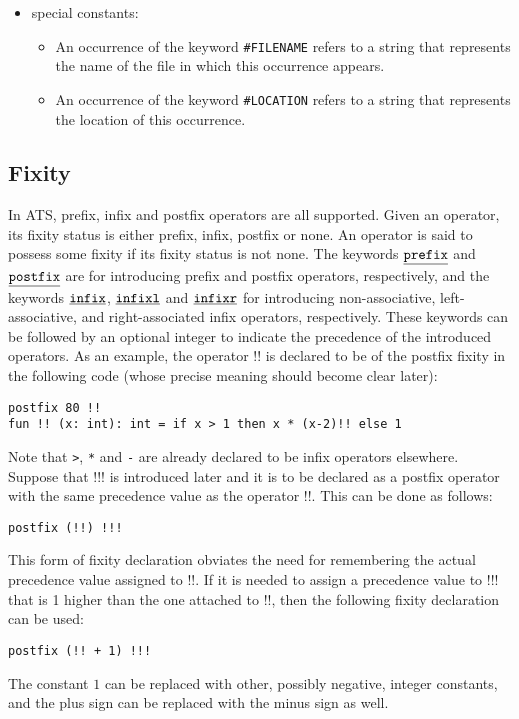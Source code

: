 \begin{itemize}
\item
special constants:
\begin{itemize}
\item 
An occurrence of the keyword \texttt{\#FILENAME} refers
to a string that represents the name of the file in which this occurrence
appears.
\item
An occurrence of the keyword \texttt{\#LOCATION} refers to a string that
represents the location of this occurrence.
\end{itemize}

\end{itemize}

\subsection{Fixity}
In ATS, prefix, infix and postfix operators are all supported. Given an
operator, its {fixity status} is either prefix, infix, postfix or none.  An
operator is said to possess some fixity if its fixity status is not none.
The keywords $\underline{\texttt{prefix}}$ and $\underline{\texttt{postfix}}$ are for introducing prefix and
postfix operators, respectively, and the keywords $\underline{\texttt{infix}}$, $\underline{\texttt{infixl}}$
and $\underline{\texttt{infixr}}$ for introducing non-associative, left-associative, and
right-associated infix operators, respectively. These keywords can be
followed by an optional integer to indicate the precedence of the
introduced operators.  As an example, the operator $!!$ is declared to be
of the postfix fixity in the following code (whose precise meaning should
become clear later):
\begin{verbatim}
postfix 80 !!
fun !! (x: int): int = if x > 1 then x * (x-2)!! else 1
\end{verbatim}
Note that \texttt{>}, \texttt{*} and \texttt{-} are already declared to be
infix operators elsewhere. Suppose that $!!!$ is introduced later and it is
to be declared as a postfix operator with the same precedence value as the
operator $!!$. This can be done as follows:
\begin{verbatim}
postfix (!!) !!!
\end{verbatim}
This form of fixity declaration obviates the need for remembering the
actual precedence value assigned to $!!$. If it is needed to assign
a precedence value to $!!!$ that is 1 higher than the one attached to
$!!$, then the following fixity declaration can be used:
\begin{verbatim}
postfix (!! + 1) !!!
\end{verbatim}
The constant $1$ can be replaced with other, possibly negative, integer
constants, and the plus sign can be replaced with the minus sign as well.

